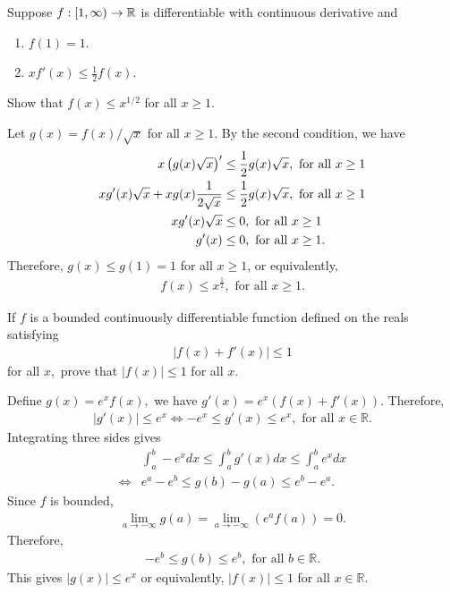 \begin{problem}
Suppose $f: [1, \infty) \to \mathbb{R}$ is differentiable with continuous derivative and
\begin{enumerate}
    \item[(a)] $f(1) = 1$.
    \item[(b)] $x f'(x) \leq \frac{1}{2} f(x)$.
\end{enumerate}
Show that $f(x) \leq x^{1/2}$ for all $x \geq 1$.
\begin{solution}
Let $g(x) = f(x) / \sqrt{x}$ for all $x \ge 1$. By the second condition, we have 
\begin{align*}
    x\left( g(x)\sqrt{x}\right)' &\le \dfrac{1}{2} g(x)\sqrt{x}, \text{ for all } x \ge 1 \\
    xg'(x)\sqrt{x} + xg(x)\dfrac{1}{2\sqrt{x}} &\le \dfrac{1}{2} g(x)\sqrt{x}, \text{ for all } x \ge 1 \\
    xg'(x)\sqrt{x} &\le 0, \text{ for all } x \ge 1 \\
    g'(x) &\le 0, \text{ for all } x \ge 1.
\end{align*}
Therefore, $g(x) \le g(1) = 1$ for all $x \ge 1$, or equivalently,
\begin{align*}
    f(x) \le x^\frac{1}{2}, \text{ for all } x \ge 1.
\end{align*}
\end{solution}
\end{problem}

\begin{problem}
If $f$ is a bounded continuously differentiable function defined on the reals satisfying 
\begin{align*}
    |f(x)+f'(x)|\le 1
\end{align*}
for all $x,$ prove that $|f(x)|\le 1$ for all $x.$
\begin{solution}
Define $g(x)=e^xf(x),$ we have $g'(x)=e^x(f(x)+f'(x))$. Therefore,
\begin{align*}
    |g'(x)|\le e^x\Longleftrightarrow -e^x\le g'(x)\le e^x,\text{ for all }x\in\mathbb{R}.
\end{align*}
Integrating three sides gives 
\begin{align*}
    &\int_{a}^b-e^xdx\le \int_{a}^b g'(x)dx\le\int_a^b e^xdx\\
    \Longleftrightarrow& e^a-e^b \le g(b)-g(a)\le e^b-e^a.
\end{align*}
Since $f$ is bounded, 
\begin{align*}
    \lim_{a\rightarrow-\infty} g(a)=\lim_{a\rightarrow-\infty}(e^af(a))=0.
\end{align*}
Therefore,
\begin{align*}
   -e^b\le g(b)\le e^b,\text{ for all }b\in\mathbb{R}.
\end{align*}
This gives $|g(x)|\le e^x$ or equivalently, $|f(x)|\le 1$ for all $x\in\mathbb{R}.$
\end{solution}
\end{problem}

